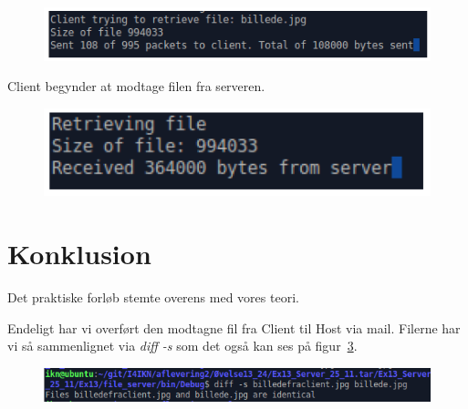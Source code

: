 \begin{figure}[H]
	\centering
	\includegraphics[width=0.7\linewidth]{figs/test3}
	\caption{}
	\label{fig:test3}
\end{figure}

Client begynder at modtage filen fra serveren.

\begin{figure}[H]
	\centering
	\includegraphics[width=0.5\linewidth]{figs/test4}
	\caption{}
	\label{fig:test4}
\end{figure}

\section{Konklusion}
Det praktiske forløb stemte overens med vores teori.

Endeligt har vi overført den modtagne fil fra Client til Host via mail. Filerne har vi så sammenlignet via \textit{diff -s} som det også kan ses på figur~\ref{fig:diff}. 

\begin{figure}[H]
	\centering
	\includegraphics[width=\linewidth]{figs/diff}
	\caption{}
	\label{fig:diff}
\end{figure}
